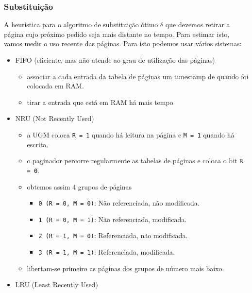 \documentclass[11pt]{article}
\begin{document}
\subsubsection{Substituição}

A heurística para o algoritmo de substituição ótimo é que devemos retirar a página cujo próximo pedido seja mais distante no tempo. Para estimar isto, vamos medir o uso recente das páginas. Para isto podemos usar vários sistemas:

\begin{itemize}
    \item FIFO (eficiente, mas não atende ao grau de utilização das páginas)
          \begin{itemize}
              \item associar a cada entrada da tabela de páginas um timestamp de quando foi colocada em RAM.
              \item tirar a entrada que está em RAM há mais tempo
          \end{itemize}
    \item NRU (Not Recently Used)
          \begin{itemize}
              \item a UGM coloca \lstinline|R = 1| quando há leitura na página e \lstinline|M = 1| quando há escrita.
              \item o paginador percorre regularmente as tabelas de páginas e coloca o bit \lstinline|R = 0|.
              \item obtemos assim 4 grupos de páginas
                    \begin{itemize}
                        \item \lstinline|0 (R = 0, M = 0)|: Não referenciada, não modificada.
                        \item \lstinline|1 (R = 0, M = 1)|: Não referenciada, modificada.
                        \item \lstinline|2 (R = 1, M = 0)|: Referenciada, não modificada.
                        \item \lstinline|3 (R = 1, M = 1)|: Referenciada, modificada.
                    \end{itemize}
              \item libertam-se primeiro as páginas dos grupos de número mais baixo.
          \end{itemize}
    \item LRU (Least Recently Used)
          \begin{itemize}

\end{itemize}
\end{itemize}
\end{document}
